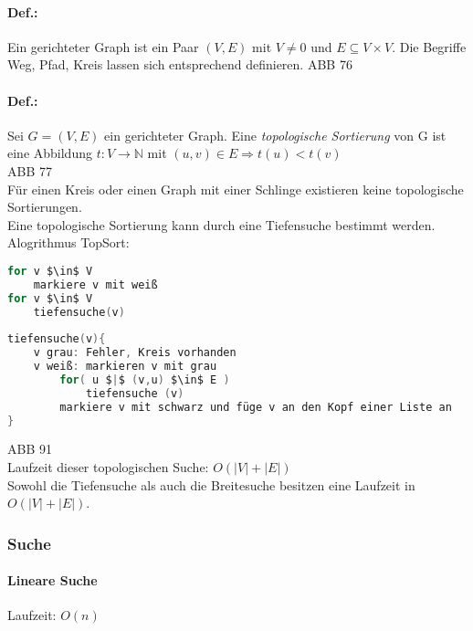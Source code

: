\paragraph{Def.:} Ein gerichteter Graph ist ein Paar $(V,E)$ mit $V\not = 0$ und $E \subseteq V \times V$. Die Begriffe Weg, Pfad, Kreis lassen sich entsprechend definieren.
ABB 76

\paragraph{Def.:} Sei $G=(V,E)$ ein gerichteter Graph. Eine \emph{topologische Sortierung} von G ist eine Abbildung $t: V\rightarrow \mathbb{N} $ mit $ (u,v) \in E \Rightarrow t(u) < t(v)$\\
ABB 77\\
Für einen Kreis oder einen Graph mit einer Schlinge existieren keine topologische Sortierungen.\medskip\\
Eine topologische Sortierung kann durch eine Tiefensuche bestimmt werden.\\
Alogrithmus TopSort:
\begin{lstlisting}[language=C]
for v $\in$ V
	markiere v mit weiß
for v $\in$ V
	tiefensuche(v)
	
tiefensuche(v){
	v grau: Fehler, Kreis vorhanden
	v weiß: markieren v mit grau
		for( u $|$ (v,u) $\in$ E )
			tiefensuche (v)
		markiere v mit schwarz und füge v an den Kopf einer Liste an
}
\end{lstlisting}
ABB 91\\
Laufzeit dieser topologischen Suche: $O(|V|+|E|)$\\
Sowohl die Tiefensuche als auch die Breitesuche besitzen eine Laufzeit in $O(|V|+|E|)$.

\subsubsection{Suche}
\paragraph{Lineare Suche} Laufzeit: $O(n)$
